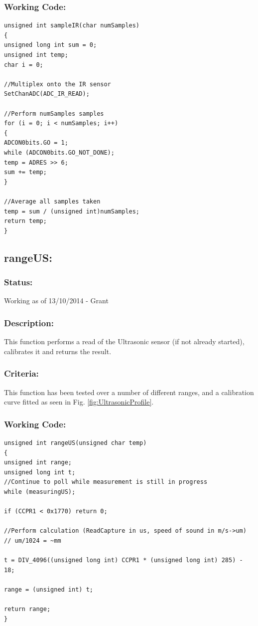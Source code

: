 \documentclass[]{report}
\begin{document}
\subsubsection{Working Code:}
\begin{lstlisting}
unsigned int sampleIR(char numSamples)
{
unsigned long int sum = 0;
unsigned int temp;
char i = 0;

//Multiplex onto the IR sensor
SetChanADC(ADC_IR_READ);

//Perform numSamples samples
for (i = 0; i < numSamples; i++)
{
ADCON0bits.GO = 1;
while (ADCON0bits.GO_NOT_DONE);
temp = ADRES >> 6;
sum += temp;
}

//Average all samples taken
temp = sum / (unsigned int)numSamples;
return temp;
}
\end{lstlisting}

\subsection{rangeUS:}
\subsubsection{Status:}
Working as of 13/10/2014 - Grant

\subsubsection{Description:}
This function performs a read of the Ultrasonic sensor (if not already started), calibrates it and returns the result.

\subsubsection{Criteria:}
This function has been tested over a number of different ranges, and a calibration curve fitted as seen in Fig. \ref{fig:UltrasonicProfile}.

\subsubsection{Working Code:}
\begin{lstlisting}
unsigned int rangeUS(unsigned char temp)
{
unsigned int range;
unsigned long int t;
//Continue to poll while measurement is still in progress
while (measuringUS);

if (CCPR1 < 0x1770) return 0;

//Perform calculation (ReadCapture in us, speed of sound in m/s->um)
// um/1024 = ~mm

t = DIV_4096((unsigned long int) CCPR1 * (unsigned long int) 285) - 18;

range = (unsigned int) t;

return range;
}
\end{lstlisting}
\end{document}
